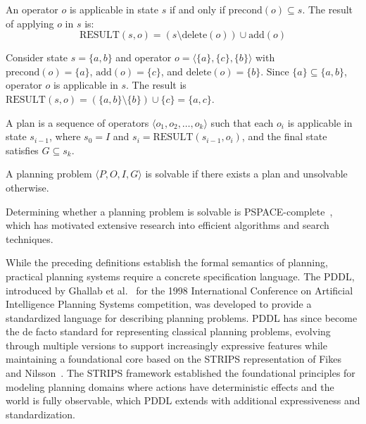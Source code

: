 \begin{defn}
    \label{defn:applicability}
    An operator $o$ is applicable in state $s$ if and only if $\text{precond}(o) \subseteq s$. The result of applying $o$ in $s$ is:
    \begin{equation*}
        \text{RESULT}(s,o) = (s \setminus \text{delete}(o)) \cup \text{add}(o)
    \end{equation*}
\end{defn}

\begin{example}
    \label{ex:operator_application}
    Consider state $s = \{a, b\}$ and operator $o = \langle \{a\}, \{c\}, \{b\} \rangle$ with $\text{precond}(o) = \{a\}$, $\text{add}(o) = \{c\}$, and $\text{delete}(o) = \{b\}$. Since $\{a\} \subseteq \{a, b\}$, operator $o$ is applicable in $s$. The result is $\text{RESULT}(s, o) = (\{a, b\} \setminus \{b\}) \cup \{c\} = \{a, c\}$.
\end{example}

\begin{defn}
    \label{defn:plan}
    A plan is a sequence of operators $\langle o_1, o_2, \ldots, o_k \rangle$ such that each $o_i$ is applicable in state $s_{i-1}$, where $s_0 = I$ and $s_i = \text{RESULT}(s_{i-1}, o_i)$, and the final state satisfies $G \subseteq s_k$.
\end{defn}

\begin{defn}
    \label{defn:solvability}
    A planning problem $\langle P, O, I, G \rangle$ is solvable if there exists a plan and unsolvable otherwise.
\end{defn}

Determining whether a planning problem is solvable is PSPACE-complete~\cite{Bylander1994}, which has motivated extensive research into efficient algorithms and search techniques.

While the preceding definitions establish the formal semantics of planning, practical planning systems require a concrete specification language. The \ac{PDDL}, introduced by Ghallab et al.~\cite{Ghallab1998} for the 1998 International Conference on Artificial Intelligence Planning Systems competition, was developed to provide a standardized language for describing planning problems. \ac{PDDL} has since become the de facto standard for representing classical planning problems, evolving through multiple versions to support increasingly expressive features while maintaining a foundational core based on the \ac{STRIPS} representation of Fikes and Nilsson~\cite{Fikes1971}. The \ac{STRIPS} framework established the foundational principles for modeling planning domains where actions have deterministic effects and the world is fully observable, which \ac{PDDL} extends with additional expressiveness and standardization.

